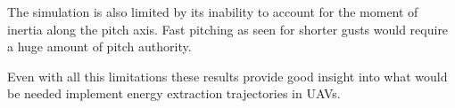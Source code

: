 \par The simulation is also limited by its inability to account for the moment of inertia along the pitch axis.
Fast pitching as seen for shorter gusts would require a huge amount of pitch authority.

\par Even with all this limitations these results provide good insight into what would be needed implement energy extraction trajectories in UAVs.


